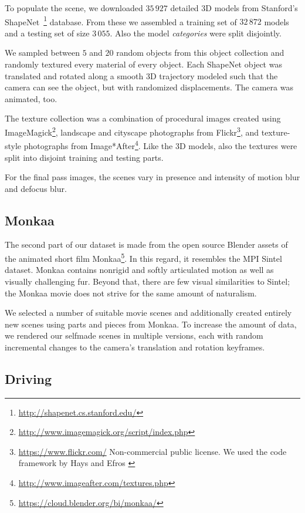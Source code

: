 \documentclass[10pt,twocolumn,letterpaper]{article}
\begin{document}
To populate the scene, we downloaded $35\,927$ detailed 3D models from Stanford's ShapeNet~\cite{Savva15}\footnote{\url{http://shapenet.cs.stanford.edu/}} database.
From these we assembled a training set of $32\,872$ models and a testing set of size $3\,055$.
Also the model \emph{categories} were split disjointly.

We sampled between $5$ and $20$ random objects from this object collection and randomly textured every material of every object.
Each ShapeNet object was translated and rotated along a smooth 3D trajectory modeled such that the camera can see the object, but with randomized displacements.
The camera was animated, too.

The texture collection was a combination of procedural images created using ImageMagick\footnote{\url{http://www.imagemagick.org/script/index.php}}, landscape and cityscape photographs from Flickr\footnote{\url{https://www.flickr.com/} Non-commercial public license. We used the code framework by Hays and Efros \cite{Hays-Efros-08}}, and texture-style photographs from Image*After\footnote{\url{http://www.imageafter.com/textures.php}}.
Like the 3D models, also the textures were split into disjoint training and testing parts.

For the final pass images, the scenes vary in presence and intensity of motion blur and defocus blur.

\subsection{Monkaa}\label{sec:monkaa}

The second part of our dataset is made from the open source Blender assets of the animated short film Monkaa\footnote{\url{https://cloud.blender.org/bi/monkaa/}}.
In this regard, it resembles the MPI Sintel dataset.
Monkaa contains nonrigid and softly articulated motion as well as visually challenging fur.
Beyond that, there are few visual similarities to Sintel; the Monkaa movie does not strive for the same amount of naturalism.

We selected a number of suitable movie scenes and additionally created entirely new scenes using parts and pieces from Monkaa.
To increase the amount of data, we rendered our selfmade scenes in multiple versions, each with random incremental changes to the camera's translation and rotation keyframes.



\subsection{Driving}\label{sec:driving}\label{sec:fakekitti}
\end{document}
